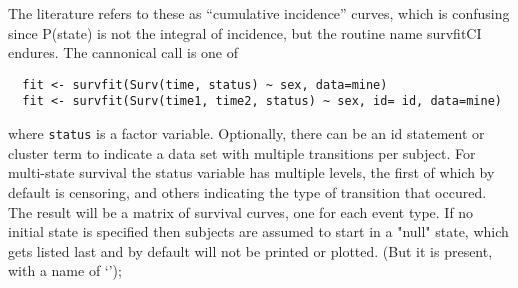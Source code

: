 \documentclass{article}
\newcommand{\code}[1]{\texttt{#1}}
\begin{document}
The literature refers to these as ``cumulative incidence'' curves,
which is confusing since P(state) is not the integral of incidence,
but the routine name survfitCI endures.
The cannonical call is one of
\begin{verbatim}
  fit <- survfit(Surv(time, status) ~ sex, data=mine)
  fit <- survfit(Surv(time1, time2, status) ~ sex, id= id, data=mine)
\end{verbatim}
where \code{status} is a factor variable.
Optionally, there can be an id statement
or cluster term to indicate a data set with multiple transitions per subject.
For multi-state survival the status variable has multiple levels,
the first of which by default is censoring, and others indicating
the type of transition that occured.
The result will be a matrix of survival curves, one for each event type.
If no initial state is specified then subjects are assumed
to start in a "null" state, which gets listed last and by default will
not be printed or plotted.  (But it is present, with a name of `');
  
\end{document}
